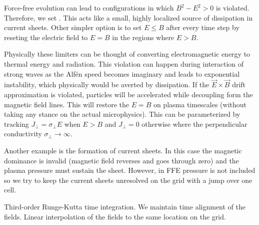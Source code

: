 \documentclass{aa}
\begin{document}
Force-free evolution can lead to configurations in which $B^2 - E^2 > 0$ is violated.
Therefore, we set
\be
{} \rightarrow {} .
\ee
This acts like a small, highly localized source of dissipation in current sheets.
Other simpler option is to set $E \leq B$ after every time step by reseting the electric field to $E = B$ in the regions where $E > B$.

Physically these limiters can be thought of converting electromagnetic energy to thermal energy and radiation.
This violation can happen during interaction of strong waves as the Alf\'en speed becomes imaginary and leads to exponential instability, which physically would be averted by dissipation. 
If the $\vec{E} \times \vec{B}$ drift approximation is violated, particles will be accelerated while decoupling form the magnetic field lines. 
This will restore the $E=B$ on plasma timescales (without taking any stance on the actual microphysics).
This can be parameterized by tracking $J_{\perp} = \sigma_{\perp} E$ when $E>B$ and $J_{\perp} = 0$ otherwise where the perpendicular conductivity $\sigma_{\perp} \rightarrow \infty$.

Another example is the formation of current sheets.
In this case the magnetic dominance is invalid (magnetic field reverses and goes through zero) and the plasma pressure must sustain the sheet.
However, in FFE pressure is not included so we try to keep the current sheets unresolved on the grid with a jump over one cell.



Third-order Runge-Kutta time integration.
We maintain time alignment of the fields.
Linear interpolation of the fields to the same location on the grid.




%
%



%
\end{document}

